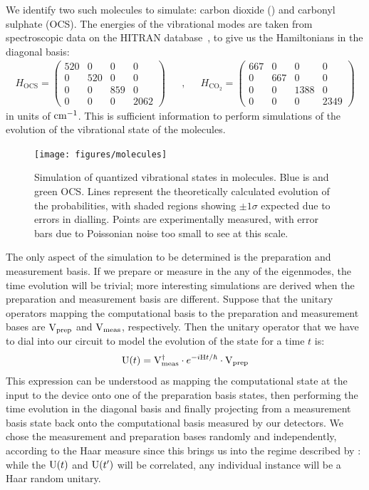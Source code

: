 We identify two such molecules to simulate: carbon dioxide (\co{}) and carbonyl
sulphate (OCS). The energies of the vibrational modes are taken from
spectroscopic data on the HITRAN database~\cite{hitran}, to give us the
Hamiltonians in the diagonal basis:
\begin{align}
  H_{\text{OCS}} = \begin{pmatrix}
    520 & 0 & 0 & 0 \\
    0 & 520 & 0 & 0 \\
    0 & 0 & 859 & 0 \\
    0 & 0 & 0 & 2062 \end{pmatrix} && , && H_{\text{CO}_{2}} = \begin{pmatrix}
    667 & 0 & 0 & 0 \\
    0 & 667 & 0 & 0 \\
    0 & 0 & 1388 & 0 \\
    0 & 0 & 0 & 2349 \end{pmatrix}
\end{align}
in units of \(\text{cm}^{-1}\). This is sufficient information to perform simulations
of the evolution of the vibrational state of the molecules.

\begin{figure}
  \centering
  \texttt{[image: figures/molecules]}
  \caption[Simulation of quantized vibrational states in molecules]
  {Simulation of quantized vibrational states in molecules. Blue is \co{} and
  green OCS. Lines represent the theoretically calculated evolution of the
  probabilities, with shaded regions showing \(\pm 1 \sigma\) expected due to
  errors in dialling. Points are experimentally measured, with error bars due to
  Poissonian noise too small to see at this scale.}
  \label{fig:molecules}
\end{figure}

The only aspect of the simulation to be determined is the preparation and
measurement basis. If we prepare or measure in the any of the eigenmodes, the
time evolution will be trivial; more interesting simulations are derived when
the preparation and measurement basis are different. Suppose that the unitary
operators mapping the computational basis to the preparation and measurement
bases are \(\mathrm{V}_{\text{prep}}\) and \(\mathrm{V}_{\text{meas}}\), respectively. Then the
unitary operator that we have to dial into our circuit to model the evolution of
the state for a time \(t\) is:
\begin{equation}
  \mathrm{U} \!\left(t\right) = \mathrm{V}_{\text{meas}}^{\dagger} \cdot e^{-i \mathrm{H} t/\hbar} \cdot
  \mathrm{V}_{\text{prep}}
\end{equation}
This expression can be understood as mapping the computational state at the
input to the device onto one of the preparation basis states, then performing
the time evolution in the diagonal basis and finally projecting from a
measurement basis state back onto the computational basis measured by our
detectors. We chose the measurement and preparation bases randomly and
independently, according to the Haar measure since this brings us into the
regime described by \bosonsampling{}: while the \(\mathrm{U} \!\left(t\right)\) and \(\mathrm{U}
\!\left(t^{\prime}\right) \) will be correlated, any individual instance will be a Haar
random unitary.

